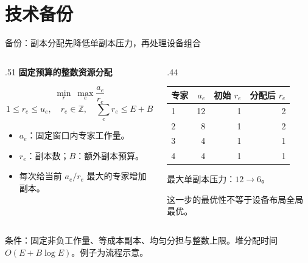 \documentclass[aspectratio=169,10pt]{beamer}
\newcommand{\src}[1]{\vfill{\fontsize{6.7}{8}\selectfont\color{Muted}#1}\par}
\newcommand{\lead}[1]{{\color{Teal}\large\bfseries #1}\par\medskip}
\newcommand{\warn}[1]{\textcolor{Amber}{#1}}
\begin{document}
\section{技术备份}
\begin{frame}{备份：副本分配先降低单副本压力，再处理设备组合}
\begin{columns}[T]
\begin{column}{.51\textwidth}
\lead{固定预算的整数资源分配}
\[\min_{r}\ \max_e\frac{a_e}{r_e}\]
\[1\le r_e\le u_e,\quad r_e\in\mathbb Z,\quad\sum_e r_e\le E+B\]
\begin{itemize}
\item $a_e$：固定窗口内专家工作量。
\item $r_e$：副本数；$B$：额外副本预算。
\item 每次给当前 $a_e/r_e$ 最大的专家增加副本。
\end{itemize}
\end{column}
\begin{column}{.44\textwidth}
\renewcommand{\arraystretch}{1.5}
\begin{tabular}{@{}lrrr@{}}
\toprule 专家 & $a_e$ & 初始 $r_e$ & 分配后 $r_e$\\\midrule
1 & 12 & 1 & 2\\
2 & 8 & 1 & 2\\
3 & 4 & 1 & 1\\
4 & 4 & 1 & 1\\\bottomrule
\end{tabular}
\par\medskip
最大单副本压力：$12\rightarrow6$。
\par\smallskip
\warn{这一步的最优性不等于设备布局全局最优。}
\end{column}
\end{columns}
\src{条件：固定非负工作量、等成本副本、均匀分担与整数上限。堆分配时间 $O(E+B\log E)$。例子为流程示意。}
\end{frame}
\end{document}
